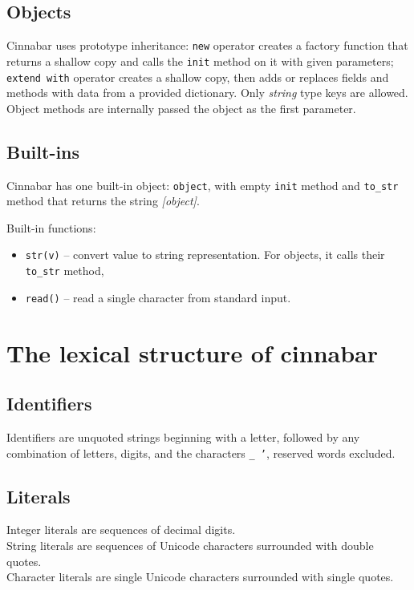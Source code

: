 \documentclass[a4paper,11pt]{article}
\begin{document}
\subsection*{Objects}

Cinnabar uses prototype inheritance: {\tt new} operator creates a factory function that returns a shallow copy and calls the {\tt init} method on it with given parameters; {\tt extend with} operator creates a shallow copy, then adds or replaces fields and methods with data from a provided dictionary. Only \emph{string} type keys are allowed.\\
Object methods are internally passed the object as the first parameter.

\subsection*{Built-ins}
Cinnabar has one built-in object: {\tt object}, with empty {\tt init} method and {\tt to\_str} method that returns the string \emph{[object]}.

Built-in functions:
\begin{itemize}
\item {\tt str(v)} -- convert value to string representation. For objects, it calls their {\tt to\_str} method,
\item {\tt read()} -- read a single character from standard input.
\end{itemize}


\section*{The lexical structure of cinnabar}
\subsection*{Identifiers}
Identifiers  are unquoted strings beginning with a letter,
followed by any combination of letters, digits, and the characters {\tt \_ '},
reserved words excluded.


\subsection*{Literals}

Integer literals  are sequences of decimal digits.\\
String literals  are sequences of Unicode characters surrounded with double quotes.\\
Character literals  are single Unicode characters surrounded with single quotes.
\end{document}
